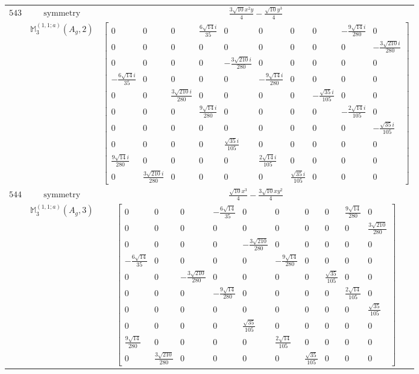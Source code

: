 \documentclass[fleqn,8pt,landscape]{jsarticle}
\begin{document}
\begin{longtable}{ccc}
$ 543 $ & $ \text{symmetry} $ & $ \frac{3 \sqrt{10} x^{2} y}{4} - \frac{\sqrt{10} y^{3}}{4} $ \\
$  $ & $ \mathbb{M}_{3}^{(1,1;a)}(A_{g},2) $ & $ \begin{bmatrix} 0 & 0 & 0 & \frac{6 \sqrt{14} i}{35} & 0 & 0 & 0 & 0 & - \frac{9 \sqrt{14} i}{280} & 0 \\ 0 & 0 & 0 & 0 & 0 & 0 & 0 & 0 & 0 & - \frac{3 \sqrt{210} i}{280} \\ 0 & 0 & 0 & 0 & - \frac{3 \sqrt{210} i}{280} & 0 & 0 & 0 & 0 & 0 \\ - \frac{6 \sqrt{14} i}{35} & 0 & 0 & 0 & 0 & - \frac{9 \sqrt{14} i}{280} & 0 & 0 & 0 & 0 \\ 0 & 0 & \frac{3 \sqrt{210} i}{280} & 0 & 0 & 0 & 0 & - \frac{\sqrt{35} i}{105} & 0 & 0 \\ 0 & 0 & 0 & \frac{9 \sqrt{14} i}{280} & 0 & 0 & 0 & 0 & - \frac{2 \sqrt{14} i}{105} & 0 \\ 0 & 0 & 0 & 0 & 0 & 0 & 0 & 0 & 0 & - \frac{\sqrt{35} i}{105} \\ 0 & 0 & 0 & 0 & \frac{\sqrt{35} i}{105} & 0 & 0 & 0 & 0 & 0 \\ \frac{9 \sqrt{14} i}{280} & 0 & 0 & 0 & 0 & \frac{2 \sqrt{14} i}{105} & 0 & 0 & 0 & 0 \\ 0 & \frac{3 \sqrt{210} i}{280} & 0 & 0 & 0 & 0 & \frac{\sqrt{35} i}{105} & 0 & 0 & 0 \end{bmatrix} $ \\ \hline
$ 544 $ & $ \text{symmetry} $ & $ \frac{\sqrt{10} x^{3}}{4} - \frac{3 \sqrt{10} x y^{2}}{4} $ \\
$  $ & $ \mathbb{M}_{3}^{(1,1;a)}(A_{g},3) $ & $ \begin{bmatrix} 0 & 0 & 0 & - \frac{6 \sqrt{14}}{35} & 0 & 0 & 0 & 0 & \frac{9 \sqrt{14}}{280} & 0 \\ 0 & 0 & 0 & 0 & 0 & 0 & 0 & 0 & 0 & \frac{3 \sqrt{210}}{280} \\ 0 & 0 & 0 & 0 & - \frac{3 \sqrt{210}}{280} & 0 & 0 & 0 & 0 & 0 \\ - \frac{6 \sqrt{14}}{35} & 0 & 0 & 0 & 0 & - \frac{9 \sqrt{14}}{280} & 0 & 0 & 0 & 0 \\ 0 & 0 & - \frac{3 \sqrt{210}}{280} & 0 & 0 & 0 & 0 & \frac{\sqrt{35}}{105} & 0 & 0 \\ 0 & 0 & 0 & - \frac{9 \sqrt{14}}{280} & 0 & 0 & 0 & 0 & \frac{2 \sqrt{14}}{105} & 0 \\ 0 & 0 & 0 & 0 & 0 & 0 & 0 & 0 & 0 & \frac{\sqrt{35}}{105} \\ 0 & 0 & 0 & 0 & \frac{\sqrt{35}}{105} & 0 & 0 & 0 & 0 & 0 \\ \frac{9 \sqrt{14}}{280} & 0 & 0 & 0 & 0 & \frac{2 \sqrt{14}}{105} & 0 & 0 & 0 & 0 \\ 0 & \frac{3 \sqrt{210}}{280} & 0 & 0 & 0 & 0 & \frac{\sqrt{35}}{105} & 0 & 0 & 0 \end{bmatrix} $ \\ \hline

\end{longtable}
\end{document}
